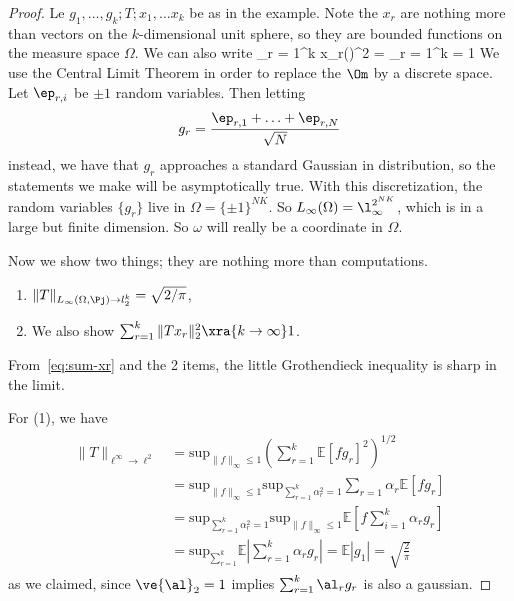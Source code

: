 \begin{proof}
Le $g_1,\ldots, g_k; T; x_1,\ldots x_k$ be as in the example. Note the $x_r$ are nothing more than vectors on the $k$-dimensional unit sphere, so they are bounded functions on the measure space $\Omega$.  We can also write
\sum_{r = 1}^k x_r(\omega)^2 = \sum_{r = 1}^k  = 1
\eeq
We use the Central Limit Theorem in order to replace the $\Om$ by a discrete space. Let $\ep_{r,i}$ be $\pm1$ random variables. Then letting
\[
g_r=\frac{\ep_{r,1} + \ldots + \ep_{r,N}}{\sqrt{N}}
\]
instead, we have that $g_r$ approaches a standard Gaussian in distribution, 
so the statements we make will be asymptotically true. With this discretization, the random variables $\{g_r\}$ live in %
$\Omega = \{\pm 1\}^{NK}$. So $L_{\infty}(\Omega) = \l_{\infty}^{2^{NK}}$, which is in a large but finite dimension. So $\omega$ will really be a coordinate in $\Omega$. 

Now we show two things; they are nothing more than computations. 
\begin{enumerate}
\item $\|T\|_{L_{\infty}(\Omega, \Pj) \to l_2^k} = \sqrt{2/\pi}$, 
\item We also show $\sum_{r = 1}^k \|Tx_r\|_2^2 \xra{k \to \infty} 1$. 
\end{enumerate}
From~\eqref{eq:sum-xr} and the 2 items, the little Grothendieck inequality is sharp in the limit.

For (1), we have 
\begin{align}
\begin{split}
\|T\|_{\ell^\infty \to \ell^2} &= \text{sup}_{\|f\|_{\infty} \leq 1}\left(\sum_{r = 1}^k \mathbb{E}\left[fg_r\right]^2 \right)^{1/2}
\\
&= \text{sup}_{\|f\|_{\infty} \leq 1} \text{sup}_{\sum_{r = 1}^k \alpha_r^2 = 1} \sum_{r = 1}\alpha_r \mathbb{E}\left[fg_r\right]
\\
&= \text{sup}_{\sum_{r = 1}^k \alpha_r^2 = 1} \text{sup}_{\|f\|_{\infty} \leq 1} \mathbb{E}\left[f\sum_{i = 1}^k \alpha_r g_r \right]
\\
&= \text{sup}_{\sum_{r = 1}^k} \mathbb{E}\left| \sum_{r = 1}^k \alpha_r g_r \right| = \mathbb{E} |g_1| = \sqrt{\frac{2}{\pi}}
\end{split}
\end{align}
as we claimed, since $\ve{\al}_2=1$ implies $\sum_{r=1}^k \al_rg_r$ is also a gaussian.


\end{proof}
